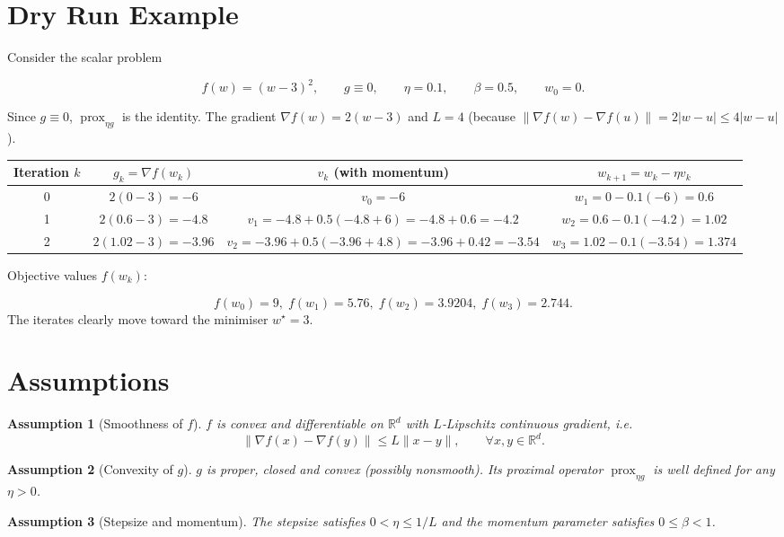 \documentclass[11pt]{article}
\newtheorem{assumption}{Assumption}
\newcommand{\prox}{\operatorname{prox}}
\newcommand{\grad}{\nabla}
\newcommand{\R}{\mathbb{R}}
\begin{document}
\section*{Dry Run Example}
Consider the scalar problem  

\[
f(w)=(w-3)^{2},\qquad g\equiv 0,\qquad \eta=0.1,\qquad \beta=0.5,\qquad w_0=0.
\]

Since $g\equiv0$, $\prox_{\eta g}$ is the identity. The gradient $\grad f(w)=2(w-3)$ and $L=4$ (because $\|\grad f(w)-\grad f(u)\|=2|w-u|\le 4|w-u|$).  

\begin{center}
\begin{tabular}{c|c|c|c}
Iteration $k$ & $g_k=\grad f(w_k)$ & $v_k$ (with momentum) & $w_{k+1}=w_k-\eta v_k$ \\ \hline
0 & $2(0-3)=-6$ & $v_0=-6$ & $w_1=0-0.1(-6)=0.6$ \\[4pt]
1 & $2(0.6-3)=-4.8$ & $v_1=-4.8+0.5(-4.8+6)=-4.8+0.6=-4.2$ & $w_2=0.6-0.1(-4.2)=1.02$ \\[4pt]
2 & $2(1.02-3)=-3.96$ & $v_2=-3.96+0.5(-3.96+4.8)=-3.96+0.42=-3.54$ & $w_3=1.02-0.1(-3.54)=1.374$ 
\end{tabular}
\end{center}

Objective values $f(w_k)$:  

\[
f(w_0)=9,\; f(w_1)=5.76,\; f(w_2)=3.9204,\; f(w_3)=2.744.\]  
The iterates clearly move toward the minimiser $w^\star=3$.

\newpage
\section*{Assumptions}
\begin{assumption}[Smoothness of $f$]\label{ass:smooth}
$f$ is convex and differentiable on $\R^{d}$ with $L$‑Lipschitz continuous gradient, i.e.  
\[
\|\grad f(x)-\grad f(y)\|\le L\|x-y\|,\qquad\forall x,y\in\R^{d}.
\]
\end{assumption}

\begin{assumption}[Convexity of $g$]\label{ass:convex}
$g$ is proper, closed and convex (possibly nonsmooth). Its proximal operator $\prox_{\eta g}$ is well defined for any $\eta>0$.
\end{assumption}

\begin{assumption}[Stepsize and momentum]\label{ass:params}
The stepsize satisfies $0<\eta\le 1/L$ and the momentum parameter satisfies $0\le\beta<1$.
\end{assumption}
\end{document}
